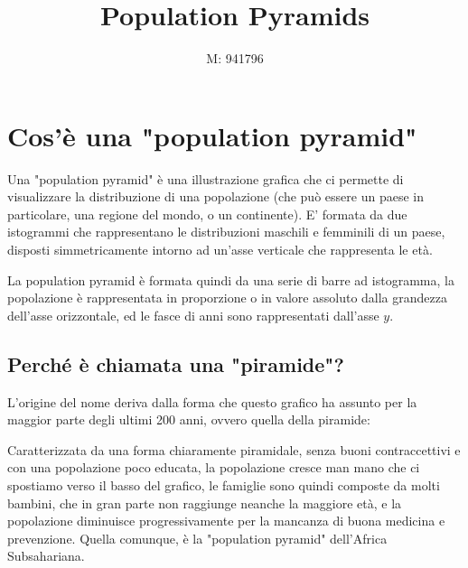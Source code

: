 \documentclass[11pt, oneside]{article}   	%
\title{Population Pyramids}
\author{M: 941796}
\begin{document}
\maketitle


\tableofcontents
\pagebreak
\section{Cos'è una "population pyramid"}
Una "population pyramid" è una illustrazione grafica che ci permette di visualizzare la distribuzione di una popolazione (che può essere un paese in particolare, una regione del mondo, o un continente). E' formata da due istogrammi che rappresentano le distribuzioni maschili e femminili di un paese, disposti simmetricamente intorno ad un'asse verticale che rappresenta le età.

La population pyramid è formata quindi da una serie di barre ad istogramma, la popolazione è rappresentata in proporzione o in valore assoluto dalla grandezza dell'asse orizzontale, ed le fasce di anni sono rappresentati dall'asse $y$.


\begin{center}
\end{center}

\subsection{Perché è chiamata una "piramide"?}
L'origine del nome deriva dalla forma che questo grafico ha assunto per la maggior parte degli ultimi 200 anni, ovvero quella della piramide:
\begin{center}
\end{center}
Caratterizzata da una forma chiaramente piramidale, senza buoni contraccettivi e con una popolazione poco educata, la popolazione cresce man mano che ci spostiamo verso il basso del grafico, le famiglie sono quindi composte da molti bambini, che in gran parte non raggiunge neanche la maggiore età, e la popolazione diminuisce progressivamente per la mancanza di buona medicina e prevenzione. Quella comunque, è la "population pyramid" dell'Africa Subsahariana.
\end{document}
